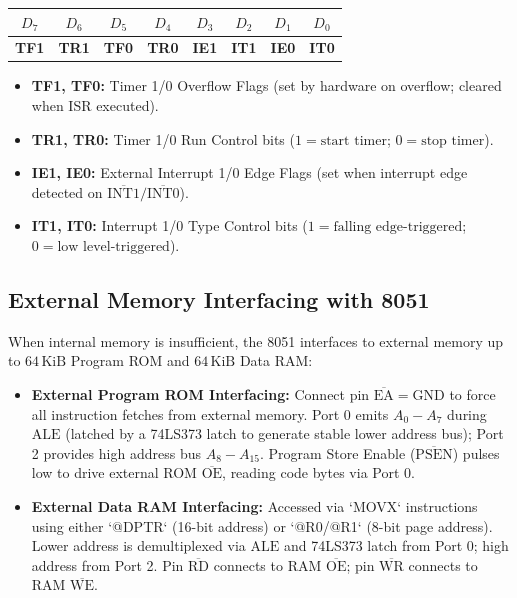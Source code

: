 \documentclass[12pt,a4paper]{article}
\begin{document}
\begin{tcolorbox}[formulabox, title={Timer Control Register (TCON, Address \texttt{88H})}]
\centering
\begin{tabular}{|c|c|c|c|c|c|c|c|}
\hline
\textbf{$D_7$} & \textbf{$D_6$} & \textbf{$D_5$} & \textbf{$D_4$} & \textbf{$D_3$} & \textbf{$D_2$} & \textbf{$D_1$} & \textbf{$D_0$} \\ \hline
\textbf{TF1} & \textbf{TR1} & \textbf{TF0} & \textbf{TR0} & \textbf{IE1} & \textbf{IT1} & \textbf{IE0} & \textbf{IT0} \\ \hline
\end{tabular}
\par\vspace{3pt}\raggedright
\begin{itemize}[leftmargin=*, itemsep=1.5pt]
  \item \textbf{TF1, TF0:} Timer 1/0 Overflow Flags (set by hardware on overflow; cleared when ISR executed).
  \item \textbf{TR1, TR0:} Timer 1/0 Run Control bits ($1 = \text{start timer}$; $0 = \text{stop timer}$).
  \item \textbf{IE1, IE0:} External Interrupt 1/0 Edge Flags (set when interrupt edge detected on $\overline{\mathrm{INT1}}/\overline{\mathrm{INT0}}$).
  \item \textbf{IT1, IT0:} Interrupt 1/0 Type Control bits ($1 = \text{falling edge-triggered}$; $0 = \text{low level-triggered}$).
\end{itemize}
\end{tcolorbox}

\subsection{External Memory Interfacing with 8051}
When internal memory is insufficient, the 8051 interfaces to external memory up to $64\,\mathrm{KiB}$ Program ROM and $64\,\mathrm{KiB}$ Data RAM:
\begin{itemize}[leftmargin=*, itemsep=2.5pt]
  \item \textbf{External Program ROM Interfacing:} Connect pin $\overline{\mathrm{EA}} = \mathrm{GND}$ to force all instruction fetches from external memory. Port 0 emits $A_0-A_7$ during $\mathrm{ALE}$ (latched by a 74LS373 latch to generate stable lower address bus); Port 2 provides high address bus $A_8-A_{15}$. Program Store Enable ($\overline{\mathrm{PSEN}}$) pulses low to drive external ROM $\overline{\mathrm{OE}}$, reading code bytes via Port 0.
  \item \textbf{External Data RAM Interfacing:} Accessed via `MOVX` instructions using either `@DPTR` (16-bit address) or `@R0/@R1` (8-bit page address). Lower address is demultiplexed via $\mathrm{ALE}$ and 74LS373 latch from Port 0; high address from Port 2. Pin $\overline{\mathrm{RD}}$ connects to RAM $\overline{\mathrm{OE}}$; pin $\overline{\mathrm{WR}}$ connects to RAM $\overline{\mathrm{WE}}$.
\end{itemize}
\end{document}

